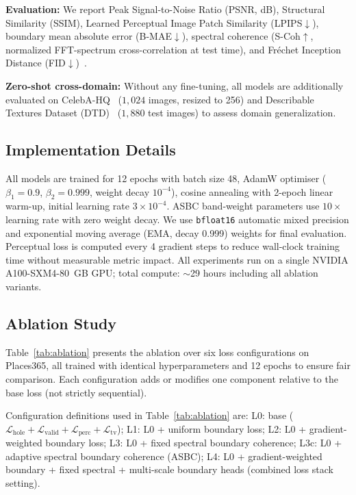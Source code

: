 \documentclass[10pt,conference]{IEEEtran}
\newcommand{\Lhole}{\mathcal{L}_{\mathrm{hole}}}
\newcommand{\Lvalid}{\mathcal{L}_{\mathrm{valid}}}
\newcommand{\Lperc}{\mathcal{L}_{\mathrm{perc}}}
\newcommand{\Ltv}{\mathcal{L}_{\mathrm{tv}}}
\begin{document}
\textbf{Evaluation:}
We report Peak Signal-to-Noise Ratio (PSNR, dB), Structural Similarity
(SSIM), Learned Perceptual Image Patch Similarity (LPIPS$\downarrow$),
boundary mean absolute error (B-MAE$\downarrow$), spectral coherence
(S-Coh$\uparrow$, normalized FFT-spectrum cross-correlation at test time), and
Fréchet Inception Distance (FID$\downarrow$)~\cite{heusel2017gans}.

\textbf{Zero-shot cross-domain:}
Without any fine-tuning, all models are additionally evaluated on
CelebA-HQ~\cite{karras2018progressive} ($1{,}024$ images, resized to 256)
and Describable Textures Dataset (DTD)~\cite{cimpoi2014describing}
($1{,}880$ test images) to assess domain generalization.

\subsection{Implementation Details}
All models are trained for 12 epochs with batch size 48, AdamW optimiser
($\beta_1=0.9$, $\beta_2=0.999$, weight decay $10^{-4}$), cosine annealing
with 2-epoch linear warm-up, initial learning rate $3{\times}10^{-4}$.
ASBC band-weight parameters use $10{\times}$ learning rate with zero weight
decay.  We use \texttt{bfloat16} automatic mixed precision and exponential
moving average (EMA, decay 0.999) weights for final evaluation.
Perceptual loss is computed every 4 gradient steps to reduce wall-clock
training time without measurable metric impact.
All experiments run on a single NVIDIA A100-SXM4-80~GB GPU;
total compute: $\sim$29 hours including all ablation variants.

\subsection{Ablation Study}
\label{sec:ablation}

Table~\ref{tab:ablation} presents the ablation over six loss configurations
on Places365, all trained with identical hyperparameters and 12 epochs to
ensure fair comparison.  Each configuration adds or modifies one component
relative to the base loss (not strictly sequential).

Configuration definitions used in Table~\ref{tab:ablation} are:
L0: base ($\Lhole{+}\Lvalid{+}\Lperc{+}\Ltv$);
L1: L0 + uniform boundary loss;
L2: L0 + gradient-weighted boundary loss;
L3: L0 + fixed spectral boundary coherence;
L3c: L0 + adaptive spectral boundary coherence (ASBC);
L4: L0 + gradient-weighted boundary + fixed spectral + multi-scale boundary heads
(combined loss stack setting).
\end{document}
